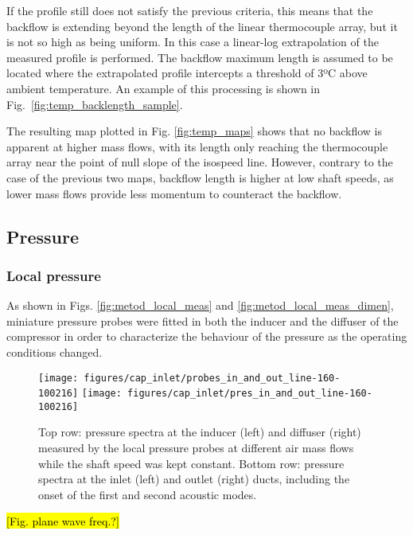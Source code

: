 If the profile still does not satisfy the previous criteria, this means that the backflow is extending beyond the length of the linear thermocouple array, but it is not so high as being uniform. In this case a linear-log extrapolation of the measured profile is performed. The backflow maximum length is assumed to be located where the extrapolated profile intercepts a threshold of 3ºC above ambient temperature. An example of this processing is shown in Fig.~\ref{fig:temp_backlength_sample}.

The resulting map plotted in Fig. \ref{fig:temp_maps} shows that no backflow is apparent at higher mass flows, with its length only reaching the thermocouple array near the point of null slope of the isospeed line. However, contrary to the case of the previous two maps, backflow length is higher at low shaft speeds, as lower mass flows provide less momentum to counteract the backflow.

\subsection{Pressure}
\label{sub:pressure}

\subsubsection{Local pressure}

As shown in Figs. \ref{fig:metod_local_meas} and \ref{fig:metod_local_meas_dimen}, miniature pressure probes were fitted in both the inducer and the diffuser of the compressor in order to characterize the behaviour of the pressure as the operating conditions changed.

\begin{figure}[thb!]
\texttt{[image: figures/cap\_inlet/probes\_in\_and\_out\_line-160-100216]}
\texttt{[image: figures/cap\_inlet/pres\_in\_and\_out\_line-160-100216]}
\caption{Top row: pressure spectra at the inducer (left) and diffuser (right) measured by the local pressure probes at different air mass flows while the shaft speed was kept constant. Bottom row: pressure spectra at the inlet (left) and outlet (right) ducts, including the onset of the first and second acoustic modes.}
\label{fig:probes_all}
\end{figure}

\hl{[Fig. plane wave freq.?]}

